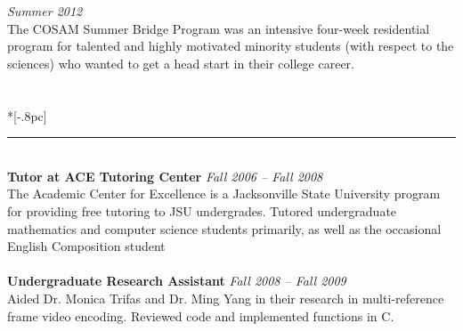 \documentclass{article}
\begin{document}
 \hfill {\it Summer 2012}\\
The COSAM Summer Bridge Program was an intensive four-week residential
program for talented and highly motivated minority students (with
respect to the sciences) who wanted to get a head start in their college career.\\
\\
 \\*[-.8pc]
\rule{\textwidth}{.1pt} \\
{\bf Tutor at ACE Tutoring Center} \hfill \textit{Fall 2006 -- Fall 2008}\\
The Academic Center for Excellence is a Jacksonville State University program
for providing free tutoring to JSU undergrades. Tutored undergraduate
mathematics and computer science students primarily, as
well as the occasional English Composition student\\
\\
{\bf Undergraduate Research Assistant} \hfill {\it Fall 2008 -- Fall 2009} \\
Aided Dr. Monica Trifas and Dr. Ming Yang in their research in multi-reference
frame video encoding. Reviewed code and implemented functions in C.\\
\end{document}
